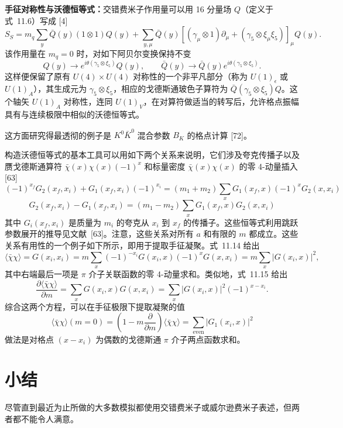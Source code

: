 \textbf{手征对称性与沃德恒等式：}交错费米子作用量可以用 16 分量场 $Q$（定义于式~11.6）写成 [4]
\begin{equation}
S_S = m_q\sum_y \bar{Q}(y)(1\otimes 1)Q(y)
+ \sum_{y,\mu}\bar{Q}(y)\left[(\gamma_\mu\otimes 1)\partial_\mu
+ (\gamma_5\otimes\xi_\mu\xi_5)\right]_\mu Q(y) .
\label{eq:sf-action-hypercube}
\end{equation}
该作用量在 $m_q = 0$ 时，对如下阿贝尔变换保持不变
\begin{equation}
Q(y) \to e^{i\theta(\gamma_5\otimes\xi_5)}Q(y), \qquad
\bar{Q}(y) \to \bar{Q}(y)e^{i\theta(\gamma_5\otimes\xi_5)} .
\label{eq:sf-abelian}
\end{equation}
这样便保留了原有 $U(4)\times U(4)$ 对称性的一个非平凡部分（称为 $U(1)_\epsilon$ 或 $U(1)_A$），其生成元为 $\gamma_5\otimes\xi_5$，相应的戈德斯通玻色子算符为 $\bar{Q}(\gamma_5\otimes\xi_5)Q$。这个轴矢 $U(1)_A$ 对称性，连同 $U(1)_V$，在对算符做适当的转写后，允许格点振幅具有与连续极限中相似的沃德恒等式。

这方面研究得最透彻的例子是 $K^0\bar{K}^0$ 混合参数 $B_K$ 的格点计算 [72]。

构造沃德恒等式的基本工具可以用如下两个关系来说明，它们涉及夸克传播子以及赝戈德斯通算符 $\bar{\chi}(x)\chi(x)(-1)^x$ 和标量密度 $\bar{\chi}(x)\chi(x)$ 的零 4-动量插入 [63]
\begin{equation}
(-1)^{x_f}G_2(x_f,x_i) + G_1(x_f,x_i)(-1)^{x_i}
= (m_1+m_2)\sum_x G_1(x_f,x)(-1)^x G_2(x,x_i)
\label{eq:sf-wi-1}
\end{equation}
\begin{equation}
G_2(x_f,x_i) - G_1(x_f,x_i)
= (m_1-m_2)\sum_x G_1(x_f,x)G_2(x,x_i)
\label{eq:sf-wi-2}
\end{equation}
其中 $G_i(x_f,x_i)$ 是质量为 $m_i$ 的夸克从 $x_i$ 到 $x_f$ 的传播子。这些恒等式利用跳跃参数展开的推导见文献~[63]。注意，这些关系对所有 $a$ 和有限的 $m$ 都成立。这些关系有用性的一个例子如下所示，即用于提取手征凝聚。式~11.14 给出
\begin{equation}
\langle\bar{\chi}\chi\rangle = G(x_i,x_i)
= m\sum_x (-1)^{-x_i}G(x_i,x)(-1)^x G(x,x_i)
= m\sum_x |G(x_i,x)|^2 ,
\label{eq:sf-condensate}
\end{equation}
其中右端最后一项是 $\pi$ 介子关联函数的零 4-动量求和。类似地，式~11.15 给出
\begin{equation}
\frac{\partial\langle\bar{\chi}\chi\rangle}{\partial m}
= \sum_x G(x_i,x)G(x,x_i)
= \sum_x |G(x_i,x)|^2(-1)^{x-x_i} .
\label{eq:sf-condensate-deriv}
\end{equation}
综合这两个方程，可以在手征极限下提取凝聚的值
\begin{equation}
\langle\bar{\chi}\chi\rangle(m=0)
= \left(1 - m\frac{\partial}{\partial m}\right)\langle\bar{\chi}\chi\rangle
= \sum_{\mathrm{even}} |G_1(x_i,x)|^2
\label{eq:sf-condensate-chiral}
\end{equation}
做法是对格点 $(x-x_i)$ 为偶数的戈德斯通 $\pi$ 介子两点函数求和。

\section{小结}

尽管直到最近为止所做的大多数模拟都使用交错费米子或威尔逊费米子表述，但两者都不能令人满意。
